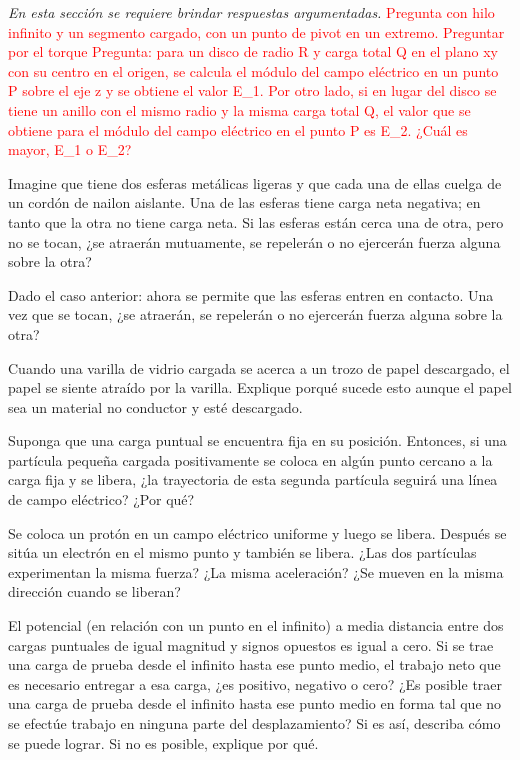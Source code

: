\textit{En esta sección se requiere brindar respuestas argumentadas.}
\setcounter{figure}{0}
%
\textcolor{red}{Pregunta con hilo infinito y un segmento cargado, con un punto de pivot en un extremo. Preguntar por el torque }
\textcolor{red}{Pregunta: para un disco de radio R y carga total Q en el plano xy con su centro en el origen, se calcula el módulo del campo eléctrico en un punto P sobre el eje z y se obtiene el valor E_1. Por otro lado, si en lugar del disco se tiene un anillo con el mismo radio y la misma carga total Q, el valor que se obtiene para el módulo del campo eléctrico en el punto P es E_2. ¿Cuál es mayor, E_1 o E_2?}
%
\begin{Exercise}
    Imagine que tiene dos esferas metálicas ligeras y que cada una de ellas cuelga de un cordón de nailon aislante. Una de las esferas tiene carga neta negativa; en tanto que la otra no tiene carga neta. Si las esferas están cerca una de otra, pero no se tocan, ¿se atraerán mutuamente, se repelerán o no ejercerán fuerza alguna sobre la otra?
\end{Exercise}
%
\begin{Exercise}
Dado el caso anterior: ahora se permite que las esferas entren en contacto. Una vez que se tocan, ¿se atraerán, se repelerán o no ejercerán fuerza alguna sobre la otra?
\end{Exercise}
%
\begin{Exercise}
    Cuando una varilla de vidrio cargada se acerca a un trozo de papel descargado, el papel se siente atraído por la varilla. Explique porqué sucede esto aunque el papel sea un material no conductor y esté descargado.
\end{Exercise}
%
\begin{Exercise}
    Suponga que una carga puntual se encuentra fija en su posición. Entonces, si una partícula pequeña cargada positivamente se coloca en algún punto cercano a la carga fija y se libera, ¿la trayectoria de esta segunda partícula seguirá una línea de campo eléctrico? ¿Por qué?
\end{Exercise}
%
\begin{Exercise}
    Se coloca un protón en un campo eléctrico uniforme y luego se libera. Después se sitúa un electrón en el mismo punto y también se libera. ¿Las dos partículas experimentan la misma fuerza? ¿La misma aceleración? ¿Se mueven en la misma dirección cuando se liberan?
\end{Exercise}
%
\begin{Exercise}
    El potencial (en relación con un punto en el infinito) a media distancia entre dos cargas puntuales de igual magnitud y signos opuestos es igual a cero. Si se trae una carga de prueba desde el infinito hasta ese punto medio, el trabajo neto que es necesario entregar a esa carga, ¿es positivo, negativo o cero? ¿Es posible traer una carga de prueba desde el infinito hasta ese punto medio en forma tal que no se efectúe trabajo en ninguna parte del desplazamiento? Si es así, describa cómo se puede lograr. Si no es posible, explique por qué.
\end{Exercise}
